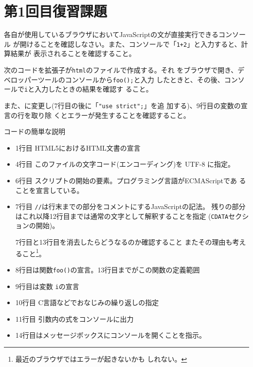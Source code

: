 \section{第1回目復習課題}
\begin{Prob}\upshape
 各自が使用しているブラウザにおいてJavaScriptの文が直接実行できるコンソール
 が開けることを確認しなさい。また、コンソールで「\texttt{1+2}」と入力すると、計算結果が
 表示されることを確認すること。
\end{Prob}
\begin{Prob}\label{FisatJS}\upshape
 次のコードを拡張子が\Verb+html+のファイルで作成する。それ
 をブラウザで開き、デベロッパーツールのコンソールから\Verb+foo();+と入力
 したときと、その後、コンソールで\texttt{i}と入力したときの結果を確認す
 ること。

 また、\Strict に変更し(7行目の後に「\Verb+"use strict";+」を追
 加する)、9行目の変数の宣言の行を取り除
 くとエラーが発生することを確認すること。
\end{Prob}
コードの簡単な説明
\begin{itemize}
 \item 1行目 HTML5におけるHTML文書の宣言
 \item 4行目 このファイルの文字コード(エンコーディング)を UTF-8 に指定。
 \item 6行目 スクリプトの開始の要素。プログラミング言語がECMAScriptであ
       ることを宣言している。
 \item 7行目 \texttt{//}は行末までの部分をコメントにするJavaScriptの記法。
残りの部分はこれ以降12行目までは通常の文字として解釈することを指定
       (\texttt{CDATA}セクションの開始)。

      7行目と13行目を消去したらどうなるのか確認すること
またその理由も考えること\footnote{最近のブラウザではエラーが起きないかも
       しれない。}。
 \item 8行目は関数\Verb+foo()+の宣言。13行目までがこの関数の定義範囲
 \item 9行目は変数 \texttt{i}の宣言
 \item 10行目 C言語などでおなじみの繰り返しの指定
 \item 11行目 引数内の式をコンソールに出力
 \item 14行目はメッセージボックスにコンソールを開くことを指示。
\end{itemize}








%










\appendix


